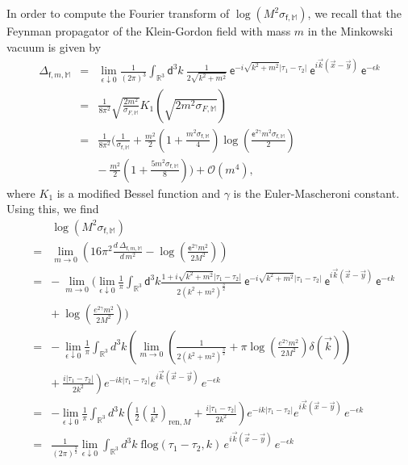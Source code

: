 \documentclass[12pt]{book}
\let\int\int
\newcommand{\Ocal}{\mathcal{O}}
\newcommand{\Mbb}{\mathbb{M}}
\newcommand{\Rbb}{\mathbb{R}}
\newcommand{\dsf}{\mathsf{d}}
\newcommand{\esf}{\mathsf{e}}
\newcommand{\fsf}{\mathsf{f}}
\theoremstyle{break}
\begin{document}
In order to compute the Fourier transform of $\log\left( M^2 \sigma_{\fsf,\Mbb}\right)$, we recall that the Feynman propagator of the Klein-Gordon field with mass $m$ in the Minkowski vacuum is given by
%
\begin{eqnarray*}
\Delta_{\fsf,m,\Mbb}&=&\lim_{\epsilon\downarrow 0} \frac{1}{(2\pi)^3} \int_{\Rbb^3} \dsf^3k \ \frac{1}{2\sqrt{k^2+m^2}} \ \esf^{-i\sqrt{k^2+m^2}|\tau_1-\tau_2|} \ \esf^{i\vec{k}\left(\vec{x}-\vec{y}\right)} \ \esf^{-\epsilon k}\\
&=&\frac{1}{8\pi^2}\sqrt{\frac{2m^2}{\sigma_{F,\Mbb}}}K_1\left(\sqrt{2 m^2\sigma_{F,\Mbb}}\right)\\
&=&\frac{1}{8\pi^2} \bigg( \frac{1}{\sigma_{\fsf,\Mbb}} + \frac{m^2}{2} \left(1+\frac{m^2 \sigma_{\fsf,\Mbb}}{4} \right) \log\left(\frac{\esf^{2\gamma}m^2 \sigma_{\fsf,\Mbb}}{2}\right) \\
&& - \ \frac{m^2}{2} \left(1+\frac{5m^2\sigma_{\fsf,\Mbb}}{8}\right)\bigg) + \Ocal(m^4),
\end{eqnarray*}
%
where $K_1$  is a modified Bessel function and $\gamma$ is the Euler-Mascheroni constant. Using this, we find
%
\begin{eqnarray*}
&&\log \left(M^2 \sigma_{\fsf,\Mbb}\right) \\
%
&=&\lim_{m\to 0}\left(16\pi^2 \frac{d \ \Delta_{\fsf,m,\Mbb}}{d \,m^2} - 
\log\left(\frac{\esf^{2\gamma}m^2}{2 M^2}\right)\right)\\
%
&=& - \ \lim_{m\to 0}\bigg(\lim_{\epsilon\downarrow 0} \frac{1}{\pi} \int_{\Rbb^3} \dsf^3 k \frac{1+i\sqrt{k^2+m^2}|\tau_1-\tau_2|}{2(k^2+m^2)^{\frac32}} \ \esf^{-i\sqrt{k^2+m^2}|\tau_1-\tau_2|} \ \esf^{i\vec{k}\left(\vec{x}-\vec{y}\right)} \ \esf^{-\epsilon k} \\
&& + \ \log\left(\frac{e^{2\gamma}m^2}{2 M^2}\right)\bigg)\\
%
&=& - \ \lim_{\epsilon\downarrow 0}\frac{1}{\pi}\int_{\Rbb^3}d^3 k\left(\lim_{m\to 0}\left(\frac{1}{2(k^2+m^2)^{\frac32}}+\pi\log\left(\frac{e^{2\gamma}m^2}{2 M^2}\right)\delta(\vec{k})\right)\right.\\
%
&& \left.+ \ \frac{i|\tau_1-\tau_2|}{2k^2}\right)e^{-ik|\tau_1-\tau_2|}e^{i\vec{k}\left(\vec{x}-\vec{y}\right)}\,e^{-\epsilon k}\\
&=&-\lim_{\epsilon\downarrow 0}\frac{1}{\pi}\int_{\Rbb^3}d^3 k\left(\frac{1}{2}\left(\frac{1}{k^3}\right)_{\text{ren},M}+\frac{i|\tau_1-\tau_2|}{2k^2}\right)e^{-ik|\tau_1-\tau_2|}e^{i\vec{k}\left(\vec{x}-\vec{y}\right)}\,e^{-\epsilon k}\\
&=&\frac{1}{(2\pi)^{\frac32}}\lim_{\epsilon\downarrow 0}\int_{\Rbb^3}d^3 k \;
\text{flog}(\tau_1-\tau_2,k)\,e^{i\vec{k}\left(\vec{x}-\vec{y}\right)}\,e^{-\epsilon k}
\end{eqnarray*}
\end{document}
